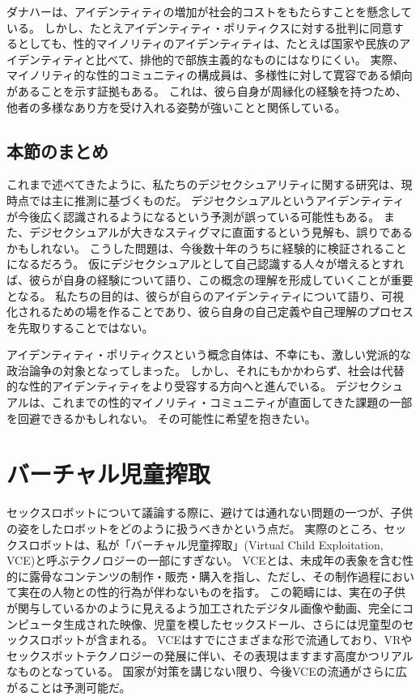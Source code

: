 \documentclass[paper=a4,book,openany]{jlreq}
\begin{document}
ダナハーは、アイデンティティの増加が社会的コストをもたらすことを懸念している。
しかし、たとえアイデンティティ・ポリティクスに対する批判に同意するとしても、性的マイノリティのアイデンティティは、たとえば国家や民族のアイデンティティと比べて、排他的で部族主義的なものにはなりにくい。
実際、マイノリティ的な性的コミュニティの構成員は、多様性に対して寛容である傾向があることを示す証拠もある。
これは、彼ら自身が周縁化の経験を持つため、他者の多様なあり方を受け入れる姿勢が強いことと関係している\citep{flores17:_yes_theres_racis_lgbt_commun}。

\subsection{本節のまとめ}

これまで述べてきたように、私たちのデジセクシュアリティに関する研究は、現時点では主に推測に基づくものだ。
デジセクシュアルというアイデンティティが今後広く認識されるようになるという予測が誤っている可能性もある。
また、デジセクシュアルが大きなスティグマに直面するという見解も、誤りであるかもしれない。
こうした問題は、今後数十年のうちに経験的に検証されることになるだろう。
仮にデジセクシュアルとして自己認識する人々が増えるとすれば、彼らが自身の経験について語り、この概念の理解を形成していくことが重要となる。
私たちの目的は、彼らが自らのアイデンティティについて語り、可視化されるための場を作ることであり、彼ら自身の自己定義や自己理解のプロセスを先取りすることではない。

アイデンティティ・ポリティクスという概念自体は、不幸にも、激しい党派的な政治論争の対象となってしまった。
しかし、それにもかかわらず、社会は代替的な性的アイデンティティをより受容する方向へと進んでいる。
デジセクシュアルは、これまでの性的マイノリティ・コミュニティが直面してきた課題の一部を回避できるかもしれない。
その可能性に希望を抱きたい。

\section{バーチャル児童搾取}

セックスロボットについて議論する際に、避けては通れない問題の一つが、子供の姿をしたロボットをどのように扱うべきかという点だ。
実際のところ、セックスロボットは、私が「バーチャル児童搾取」(Virtual Child Exploitation, VCE)と呼ぶテクノロジーの一部にすぎない。
VCEとは、未成年の表象を含む性的に露骨なコンテンツの制作・販売・購入を指し、ただし、その制作過程において実在の人物との性的行為が伴わないものを指す。
この範疇には、実在の子供が関与しているかのように見えるよう加工されたデジタル画像や動画、完全にコンピュータ生成された映像、児童を模したセックスドール、さらには児童型のセックスロボットが含まれる。
VCEはすでにさまざまな形で流通しており、VRやセックスボットテクノロジーの発展に伴い、その表現はますます高度かつリアルなものとなっている。
国家が対策を講じない限り、今後VCEの流通がさらに広がることは予測可能だ。
\end{document}
